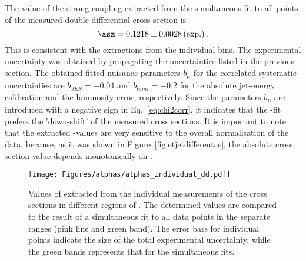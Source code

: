 The value of the strong coupling extracted from the simultaneous fit to all points of the measured double-differential cross section is
\begin{equation}
 \asz = 0.1218 \pm 0.0028 \left( \text{exp.} \right). %
 \label{eq:asdoubledifval}
\end{equation}
This is consistent with the extractions from the individual \qsq bins. The experimental uncertainty was obtained by propagating the uncertainties listed in the previous section. The obtained fitted nuisance parameters $b_{\mu}$ for the correlated systematic uncertainties are $b_{JES}=-0.04$ and $b_{lumi}=-0.2$ for the absolute jet-energy calibration and the luminosity error, respectively. Since the parameters $b_{\mu}$ are introduced with a negative sign in Eq.~\eqref{eq:chi2corr}, it indicates that the \as-fit prefers the 'down-shift' of the measured cross sections. It is important to note that the extracted \as-values are very sensitive to the overall normalisation of the data, because, as it was shown in Figure~\ref{fig:etjetdifferentas}, the absolute cross section value depends monotonically on \asz.

\begin{figure}[p]
 \centering
 \texttt{[image: Figures/alphas/alphas\_individual\_dd.pdf]}
 \caption{Values of \asz extracted from the individual measurements of the \dsdetjetb cross sections in different regions of \qsq. The determined values are compared to the result of a simultaneous fit to all data points in the separate \qsq ranges (pink line and green band). The error bars for individual points indicate the size of the total experimental uncertainty, while the green bands represents that for the simultaneous fits.}
 \label{fig:asindividual_dd}
\end{figure}

% 
